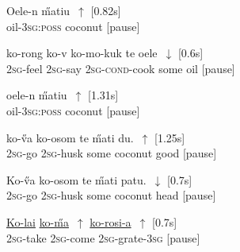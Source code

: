 \documentclass[output=paper]{LSP/langsci}
\begin{document}
 \begin{exe}
 \label{Guapp1}
\gll    Oele-n          \H{m}atiu~$\uparrow$ [0.82s]\\     	       
 oil-\textsc{3sg:poss} coconut [pause]\\
\glt {} 
\end{exe}

 \begin{exe}
  \label{Guapp2}
\gll    ko-rong        ko-v       ko-mo-kuk           te      oele~$\downarrow$ [0.6s]\\     	       
\textsc{2sg}-feel     \textsc{2sg}-say   \textsc{2sg-cond}-cook   some    oil [pause]\\
\glt {} 
\end{exe}

  \begin{exe}
 \label{Guapp3}
\gll    oele-n          \H{m}atiu~$\uparrow$ [1.31s]\\     	       
 oil-\textsc{3sg:poss} coconut [pause]\\
\glt {} 
\end{exe}


  \begin{exe}
 \label{Guapp4}
\gll    ko-\H{v}a        ko-osom         te      \H{m}ati        du.~$\uparrow$ [1.25s]\\     	       
 \textsc{2sg}-go    \textsc{2sg}-husk      some    coconut   good [pause]\\
\glt {} 
\end{exe}


  \begin{exe}
 \label{Guapp5}
\gll    Ko-\H{v}a        ko-osom         te      \H{m}ati        patu.~$\downarrow$ [0.7s]\\     	  
 \textsc{2sg}-go    \textsc{2sg}-husk      some    coconut   head [pause]\\
\glt {} 
\end{exe}

  \begin{exe}
 \label{Guapp6}
\gll    \underline{Ko-lai}      \underline{ko-\H{m}a}~$\uparrow$       \underline{ko-rosi-a}~$\uparrow$ [0.7s]\\     	       
 \textsc{2sg}-take   \textsc{2sg}-come   \textsc{2sg}-grate-\textsc{3sg} [pause]\\
\glt {} 
\end{exe}
\end{document}
